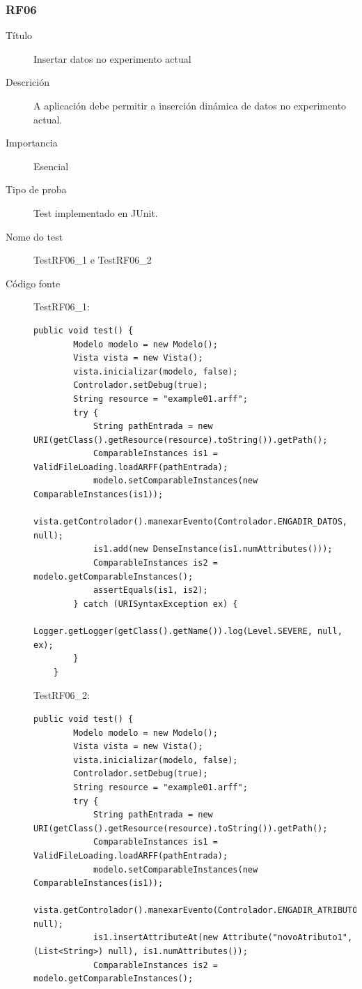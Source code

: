 \subsubsection*{RF06}
\begin{description}
\item[Título] \hfill
Insertar datos no experimento actual
\item[Descrición] \hfill
A aplicación debe permitir a inserción dinámica de datos no experimento actual.
\item[Importancia] \hfill
Esencial
\item[Tipo de proba] \hfill
Test implementado en JUnit.
\item[Nome do test] \hfill
TestRF06\_1 e TestRF06\_2
\item[Código fonte]
TestRF06\_1:
\begin{lstlisting}
public void test() {
        Modelo modelo = new Modelo();
        Vista vista = new Vista();
        vista.inicializar(modelo, false);
        Controlador.setDebug(true);
        String resource = "example01.arff";
        try {
            String pathEntrada = new URI(getClass().getResource(resource).toString()).getPath();
            ComparableInstances is1 = ValidFileLoading.loadARFF(pathEntrada);
            modelo.setComparableInstances(new ComparableInstances(is1));
            vista.getControlador().manexarEvento(Controlador.ENGADIR_DATOS, null);
            is1.add(new DenseInstance(is1.numAttributes()));
            ComparableInstances is2 = modelo.getComparableInstances();
            assertEquals(is1, is2);
        } catch (URISyntaxException ex) {
            Logger.getLogger(getClass().getName()).log(Level.SEVERE, null, ex);
        }
    }
\end{lstlisting}
TestRF06\_2:
\begin{lstlisting}
public void test() {
        Modelo modelo = new Modelo();
        Vista vista = new Vista();
        vista.inicializar(modelo, false);
        Controlador.setDebug(true);
        String resource = "example01.arff";
        try {
            String pathEntrada = new URI(getClass().getResource(resource).toString()).getPath();
            ComparableInstances is1 = ValidFileLoading.loadARFF(pathEntrada);
            modelo.setComparableInstances(new ComparableInstances(is1));
            vista.getControlador().manexarEvento(Controlador.ENGADIR_ATRIBUTO, null);
            is1.insertAttributeAt(new Attribute("novoAtributo1", (List<String>) null), is1.numAttributes());
            ComparableInstances is2 = modelo.getComparableInstances();

\end{lstlisting}
\end{description}
